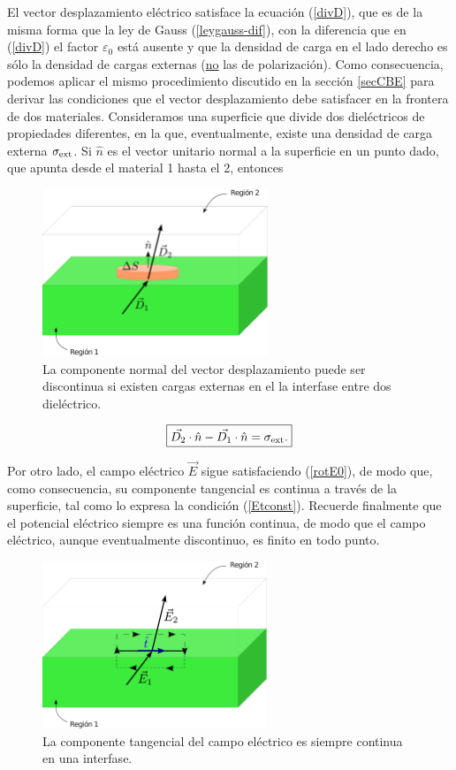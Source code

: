 El vector desplazamiento eléctrico satisface la ecuación (\ref{divD}), que es
de la misma forma que la ley de Gauss (\ref{leygauss-dif}), con la diferencia
que en (\ref{divD}) el factor $\varepsilon_0$ está ausente y que la densidad de carga en el lado derecho es sólo la densidad de cargas externas (\underline{no} las de polarización). Como consecuencia, podemos aplicar el mismo procedimiento discutido en la sección \ref{secCBE} para derivar las condiciones que el vector desplazamiento debe satisfacer en la frontera de dos materiales. Consideramos una superficie que divide dos dieléctricos de propiedades diferentes, en la que, eventualmente, existe una densidad de carga externa $\sigma_{\rm ext}$. Si $\hat{n}$ es el vector unitario normal a la superficie en un punto dado, que apunta desde el material 1 hasta el 2, entonces
\begin{figure}[!h]
\centerline{\includegraphics[height=5cm]{fig/fig-dielectrico-condicion-borde-01.pdf}}
\caption{La componente normal del vector desplazamiento puede ser discontinua
si existen cargas externas en el la interfase entre dos dieléctrico.}
\label{CF1}
\end{figure}
\begin{equation}\label{saltoDn}
\boxed{\vec{D_2}\cdot\hat{n}-\vec{D_1}\cdot\hat{n}=\sigma_{\rm
ext}.}
\end{equation}

Por otro lado, el campo eléctrico $\vec{E}$ sigue satisfaciendo (\ref{rotE0}),
de modo que, como consecuencia, su componente tangencial es continua a través
de la superficie, tal como lo expresa la condición (\ref{Etconst}). Recuerde
finalmente que el potencial eléctrico siempre es una función continua, de
modo que el campo eléctrico, aunque eventualmente discontinuo, es finito en
todo punto.
\begin{figure}[!h]
\centerline{\includegraphics[height=5cm]{fig/fig-dielectrico-condicion-borde-02.pdf}}
\caption{La componente tangencial del campo eléctrico es siempre continua
en una interfase.}
\label{CF2}
\end{figure}

